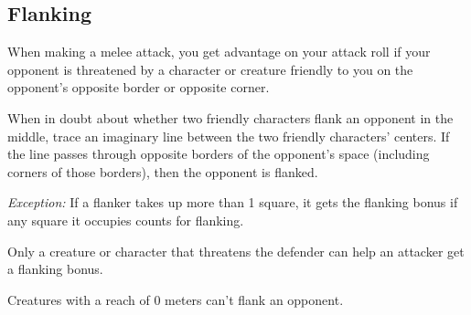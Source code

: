\subsection{Flanking}
When making a melee attack, you get advantage on your attack roll if your opponent is threatened by a character or creature friendly to you on the opponent's opposite border or opposite corner.

When in doubt about whether two friendly characters flank an opponent in the middle, trace an imaginary line between the two friendly characters' centers. If the line passes through opposite borders of the opponent's space (including corners of those borders), then the opponent is flanked.

\textit{Exception:} If a flanker takes up more than 1 square, it gets the flanking bonus if any square it occupies counts for flanking.

Only a creature or character that threatens the defender can help an attacker get a flanking bonus.

Creatures with a reach of 0 meters can't flank an opponent.